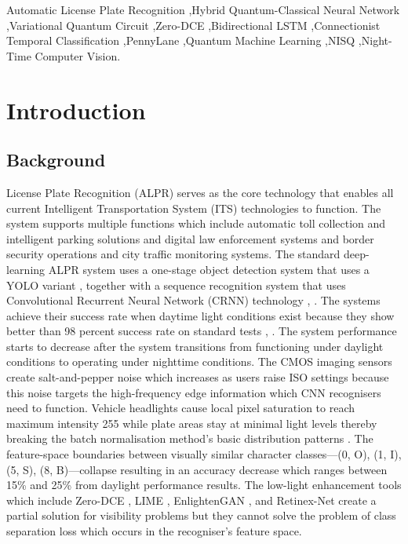 \documentclass[preprint,12pt]{elsarticle}
\begin{document}
\begin{frontmatter}
\begin{keyword}
Automatic License Plate Recognition \sep  Hybrid Quantum-Classical Neural Network \sep  Variational Quantum Circuit \sep  Zero-DCE \sep  Bidirectional LSTM \sep  Connectionist Temporal Classification \sep  PennyLane \sep  Quantum Machine Learning \sep  NISQ \sep  Night-Time Computer Vision.
\end{keyword}

\end{frontmatter}

\section{Introduction}
\label{sec:introduction}

\subsection{Background}
 License Plate Recognition (ALPR) serves as the core technology that enables all current Intelligent Transportation System (ITS) technologies to function. The system supports multiple functions which include automatic toll collection and intelligent parking solutions and digital law enforcement systems and border security operations and city traffic monitoring systems. The standard deep-learning ALPR system uses a one-stage object detection system that uses a YOLO variant \cite{b15}, \cite{b16} together with a sequence recognition system that uses Convolutional Recurrent Neural Network (CRNN) technology \cite{b12}, \cite{b14}. The systems achieve their success rate when daytime light conditions exist because they show better than 98 percent success rate on standard tests \cite{b13}, \cite{b14}. The system performance starts to decrease after the system transitions from functioning under daylight conditions to operating under nighttime conditions. The CMOS imaging sensors create salt-and-pepper noise which increases as users raise ISO settings because this noise targets the high-frequency edge information which CNN recognisers need to function. Vehicle headlights cause local pixel saturation to reach maximum intensity 255 while plate areas stay at minimal light levels thereby breaking the batch normalisation method's basic distribution patterns \cite{b37}. The feature-space boundaries between visually similar character classes---(0, O), (1, I), (5, S), (8, B)---collapse resulting in an accuracy decrease which ranges between 15\% and 25\% from daylight performance results. The low-light enhancement tools which include Zero-DCE \cite{b2}, LIME \cite{b19}, EnlightenGAN \cite{b20}, and Retinex-Net \cite{b21} create a partial solution for visibility problems but they cannot solve the problem of class separation loss which occurs in the recogniser's feature space.
\end{document}

